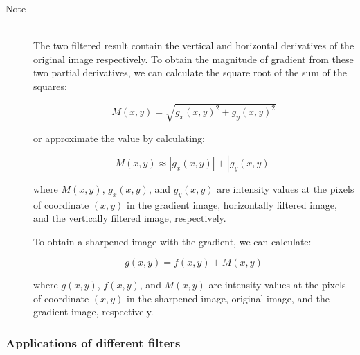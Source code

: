 \documentclass{article}
\begin{document}
\begin{description}
\item[Note] \hfill \\
The two filtered result contain the vertical and horizontal derivatives of the original image respectively. To obtain the magnitude of gradient from these two partial derivatives, we can calculate the square root of the sum of the squares:

$$M(x,y) = \sqrt{g_{x}(x, y)^2 + g_{y}(x, y)^2}$$

or approximate the value by calculating:

$$M(x,y) \approx |g_{x}(x, y)| + |g_{y}(x, y)|$$

where $M(x, y)$, $g_{x}(x, y)$, and $g_{y}(x, y)$ are intensity values at the pixels of coordinate $(x, y)$ in the gradient image, horizontally filtered image, and the vertically filtered image, respectively.

To obtain a sharpened image with the gradient, we can calculate:

$$g(x,y) = f(x, y) + M(x, y)$$

where $g(x, y)$, $f(x, y)$, and $M(x, y)$ are intensity values at the pixels of coordinate $(x, y)$ in the sharpened image, original image, and the gradient image, respectively.

\end{description}

\subsubsection{Applications of different filters}
\end{document}
